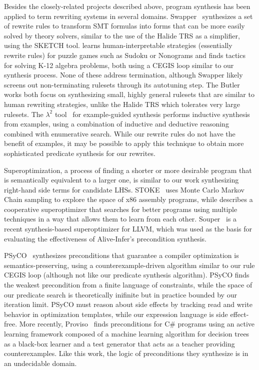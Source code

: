 \documentclass[acmsmall,review,anonymous]{acmart}\settopmatter{printfolios=true,printccs=false,printacmref=false}
\begin{document}
Besides the closely-related projects described above, program synthesis has been applied to term rewriting systems in several domains. Swapper~\cite{singh2016swapper} synthesizes a set of rewrite rules to transform SMT formulas into forms that can be more easily solved by theory solvers, similar to the use of the Halide TRS as a simplifier, using the SKETCH tool. \citet{butler2017synthesizing} learns human-interpretable strategies (essentially rewrite rules) for puzzle games such as Sudoku or Nonograms and \citet{butler2018framework} finds tactics for solving K-12 algebra problems, both using a CEGIS loop similar to our synthesis process. None of these address termination, although Swapper likely screens out non-terminating rulesets through its autotuning step. The Butler works both focus on synthesizing small, highly general rulesets that are similar to human rewriting strategies, unlike the Halide TRS which tolerates very large rulesets. The \textbf{$\lambda^2$} tool~\cite{feser2015lambda} for example-guided synthesis performs inductive synthesis from examples, using a combination of inductive and deductive reasoning combined with enumerative search.  While our rewrite rules do not have the benefit of examples, it may be possible to apply this technique to obtain more sophisticated predicate synthesis for our rewrites.

Superoptimization, a process of finding a shorter or more desirable program that is semantically equivalent to a larger one, is similar to our work synthesizing right-hand side terms for candidate LHSs. STOKE~\cite{schkufza2013stochastic} uses Monte Carlo Markov Chain sampling to explore the space of x86 assembly programs, while \citet{phothilimthana2016scaling} describes a cooperative superoptimizer that searches for better programs using multiple techniques in a way that allows them to learn from each other.  Souper~\cite{sasnauskas2017souper} is a recent synthesis-based superoptimizer for LLVM, which was used as the basis for evaluating the effectiveness of Alive-Infer's{} precondition synthesis.

PSyCO~\cite{lopes2014weakest} synthesizes preconditions that guarantee a compiler optimization is semantics-preserving, using a counterexample-driven algorithm similar to our rule CEGIS loop (although not like our predicate synthesis algorithm). PSyCO finds the weakest precondition from a finite language of constraints, while the space of our predicate search is theoretically inifinite but in practice bounded by our iteration limit. PSyCO must reason about side effects by tracking read and write behavior in optimization templates, while our expression language is side effect-free. More recently, Proviso~\cite{astorga2019learning} finds preconditions for C\# programs using an active learning framework composed of a machine learning algorithm for decision trees as a black-box learner and a test generator that acts as a teacher providing counterexamples. Like this work, the logic of preconditions they synthesize is in an undecidable domain.
\end{document}
